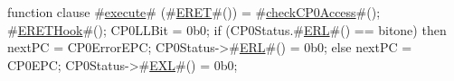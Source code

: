 function clause #\hyperref[zexecute]{execute}# (#\hyperref[zERET]{ERET}#()) =
      {
        #\hyperref[zcheckCPzeroAccess]{checkCP0Access}#();
        #\hyperref[zERETHook]{ERETHook}#();
        CP0LLBit = 0b0;
        if (CP0Status.#\hyperref[zERL]{ERL}#() == bitone) then
          {
            nextPC = CP0ErrorEPC;
            CP0Status->#\hyperref[zERL]{ERL}#() = 0b0;
          }
        else
          {
            nextPC = CP0EPC;
            CP0Status->#\hyperref[zEXL]{EXL}#() = 0b0;
          }
      }
